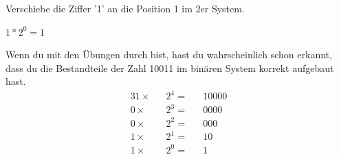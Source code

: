 \begin{exerciseseries}[columns=1,solsubrule=\hrule]{}
    \begin{exercise}
        Verschiebe die Ziffer '1' an die Position 1 im 2er System.\\
        \underline{\hspace{12cm}}
    \end{exercise}
    \begin{solution}
        $1 * 2^0 = 1$
    \end{solution}
\end{exerciseseries}

Wenn du mit den Übungen durch bist, hast du wahrscheinlich schon erkannt, dass du die Bestandteile der Zahl 10011 im binären
System korrekt aufgebaut hast.
\begin{alignat*}{3}
    1 \times && 2^4 = && 10000\\
    0 \times && 2^3 = &&  0000\\
    0 \times && 2^2 = &&   000 \\
    1 \times && 2^1 = &&    10 \\
    1 \times && 2^0 = &&     1 \\
\end{alignat*}

